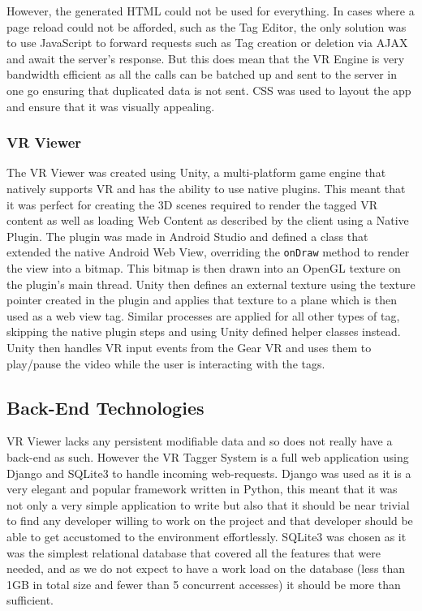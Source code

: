 \documentclass[12pt]{report}
\newcommand{\inlinecode}{\texttt}
\begin{document}
However, the generated HTML could not be used for everything. In cases where a
page reload could not be afforded, such as the Tag Editor, the only solution
was to use JavaScript to forward requests such as Tag creation or deletion via
AJAX and await the server's response. But this does mean that the VR Engine is
very bandwidth efficient as all the calls can be batched up and sent to the
server in one go ensuring that duplicated data is not sent. CSS was used to
layout the app and ensure that it was visually appealing.

\subsubsection{VR Viewer}
The VR Viewer was created using Unity, a multi-platform game engine that
natively supports VR and has the ability to use native plugins. This meant that
it was perfect for creating the 3D scenes required to render the tagged VR
content as well as loading Web Content as described by the client using a
Native Plugin. The plugin was made in Android Studio and defined a class that
extended the native Android Web View, overriding the \inlinecode{onDraw} method
to render the view into a bitmap. This bitmap is then drawn into an OpenGL
texture on the plugin's main thread. Unity then defines an external texture
using the texture pointer created in the plugin and applies that texture to a
plane which is then used as a web view tag. Similar processes are applied for
all other types of tag, skipping the native plugin steps and using Unity
defined helper classes instead. Unity then handles VR input events from the
Gear VR and uses them to play/pause the video while the user is interacting
with the tags.

\subsection{Back-End Technologies}
VR Viewer lacks any persistent modifiable data and so does not really have a
back-end as such. However the VR Tagger System is a full web application using
Django and SQLite3 to handle incoming web-requests. Django was used as it is a
very elegant and popular framework written in Python, this meant that it was
not only a very simple application to write but also that it should be near
trivial to find any developer willing to work on the project and that developer
should be able to get accustomed to the environment effortlessly. SQLite3 was
chosen as it was the simplest relational database that covered all the features
that were needed, and as we do not expect to have a work load on the database
(less than 1GB in total size and fewer than 5 concurrent accesses) it should be
more than sufficient.
\end{document}
